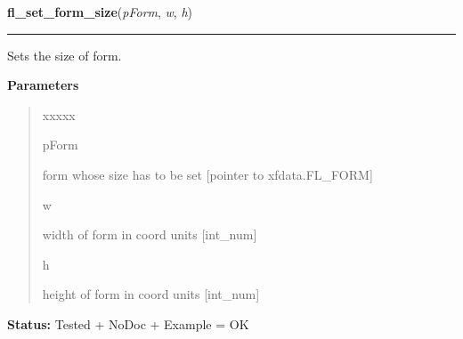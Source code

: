 \hspace{.8\funcindent}\begin{boxedminipage}{\funcwidth}

    \raggedright \textbf{fl\_set\_form\_size}(\textit{pForm}, \textit{w}, \textit{h})

    \vspace{-1.5ex}

    \rule{\textwidth}{0.5\fboxrule}
\setlength{\parskip}{2ex}
    Sets the size of form.

\setlength{\parskip}{1ex}
      \textbf{Parameters}
      \vspace{-1ex}

      \begin{quote}
        \begin{Ventry}{xxxxx}

          \item[pForm]

          form whose size has to be set [pointer to xfdata.FL\_FORM]

          \item[w]

          width of form in coord units [int\_num]

          \item[h]

          height of form in coord units [int\_num]

        \end{Ventry}

      \end{quote}

\textbf{Status:} Tested + NoDoc + Example = OK



    \end{boxedminipage}

    \label{xformslib:library:fl_set_form_hotspot}

    \vspace{0.5ex}

